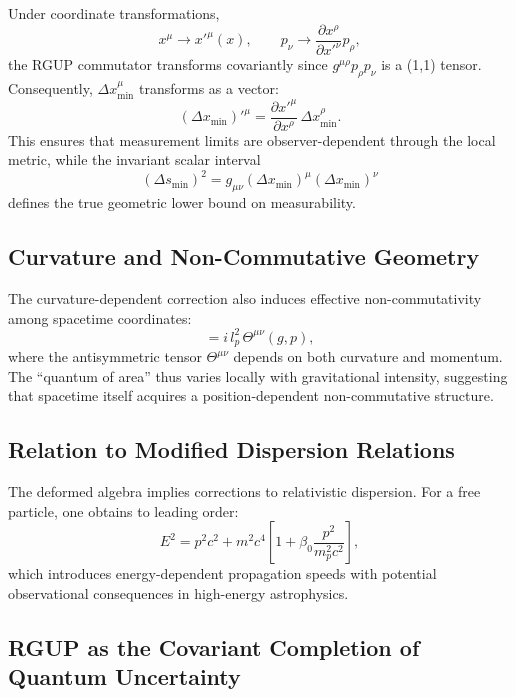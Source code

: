 \documentclass[11pt,oneside]{book}
\numberwithin{equation}{chapter}
\begin{document}
Under coordinate transformations,
\begin{equation}
x^\mu \rightarrow x'^{\mu}(x),
\qquad
p_\nu \rightarrow
\frac{\partial x^{\rho}}{\partial x'^{\nu}}p_\rho,
\end{equation}
the RGUP commutator transforms covariantly since $g^{\mu\rho}p_\rho p_\nu$ is a (1,1) tensor.  
Consequently, $\Delta x_{\min}^\mu$ transforms as a vector:
\begin{equation}
(\Delta x_{\min})'^{\mu}
=
\frac{\partial x'^{\mu}}{\partial x^{\rho}}\,
\Delta x_{\min}^{\rho}.
\end{equation}
This ensures that measurement limits are observer-dependent through the local metric, while the invariant scalar interval
\begin{equation}
(\Delta s_{\min})^2
=g_{\mu\nu}(\Delta x_{\min})^{\mu}(\Delta x_{\min})^{\nu}
\end{equation}
defines the true geometric lower bound on measurability.

\subsection*{Curvature and Non-Commutative Geometry}

The curvature-dependent correction also induces effective non-commutativity among spacetime coordinates:
\begin{equation}
[\hat{x}^\mu,\hat{x}^\nu]
= i\,l_p^2\,\Theta^{\mu\nu}(g,p),
\end{equation}
where the antisymmetric tensor $\Theta^{\mu\nu}$ depends on both curvature and momentum.  
The “quantum of area” thus varies locally with gravitational intensity, suggesting that spacetime itself acquires a position-dependent non-commutative structure.

\subsection*{Relation to Modified Dispersion Relations}

The deformed algebra implies corrections to relativistic dispersion.  
For a free particle, one obtains to leading order:
\begin{equation}
E^2 = p^2c^2 + m^2c^4
\left[1+\beta_0\frac{p^2}{m_p^2c^2}\right],
\end{equation}
which introduces energy-dependent propagation speeds with potential observational consequences in high-energy astrophysics.

\subsection*{RGUP as the Covariant Completion of Quantum Uncertainty}
\end{document}
